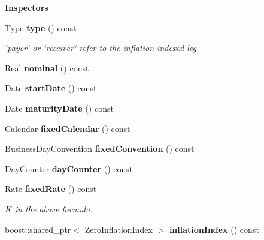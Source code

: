 \begin{Indent}{\bf Inspectors}\par
\begin{DoxyCompactItemize}
\item 
Type {\bf type} () const \label{class_quant_lib_1_1_zero_coupon_inflation_swap_a2b300346a0357c1817392c5f236bbca5}

\begin{DoxyCompactList}\small\item\em \char`\"{}payer\char`\"{} or \char`\"{}receiver\char`\"{} refer to the inflation-\/indexed leg \end{DoxyCompactList}\item 
Real {\bfseries nominal} () const \label{class_quant_lib_1_1_zero_coupon_inflation_swap_a6aaf3230fb3f514ce2f989254446b140}

\item 
Date {\bfseries start\+Date} () const \label{class_quant_lib_1_1_zero_coupon_inflation_swap_aff8a07f88bd522da568433cc6ae4b497}

\item 
Date {\bfseries maturity\+Date} () const \label{class_quant_lib_1_1_zero_coupon_inflation_swap_a1ead13d19de84cae915bf7fe70c6b2f8}

\item 
Calendar {\bfseries fixed\+Calendar} () const \label{class_quant_lib_1_1_zero_coupon_inflation_swap_a5740c8735acfe250eaeb279d73c8a257}

\item 
Business\+Day\+Convention {\bfseries fixed\+Convention} () const \label{class_quant_lib_1_1_zero_coupon_inflation_swap_ad15c46ee11e8f137967e2a281de6b76f}

\item 
Day\+Counter {\bfseries day\+Counter} () const \label{class_quant_lib_1_1_zero_coupon_inflation_swap_a795505b27ad0fcdbae9ace4719f246ee}

\item 
Rate {\bf fixed\+Rate} () const \label{class_quant_lib_1_1_zero_coupon_inflation_swap_a759d874513b0445b57d7921b19c8736b}

\begin{DoxyCompactList}\small\item\em $ K $ in the above formula. \end{DoxyCompactList}\item 
boost\+::shared\+\_\+ptr$<$ Zero\+Inflation\+Index $>$ {\bfseries inflation\+Index} () const \label{class_quant_lib_1_1_zero_coupon_inflation_swap_a6b9b9f81fe07bbf2e028c44408dda03b}


\end{DoxyCompactItemize}
\end{Indent}
